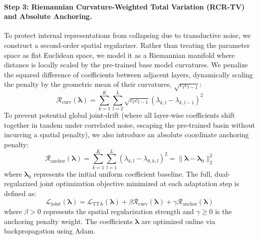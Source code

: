 \paragraph{Step 3: Riemannian Curvature-Weighted Total Variation (RCR-TV) and Absolute Anchoring.}
To protect internal representations from collapsing due to transductive noise, we construct a second-order spatial regularizer. Rather than treating the parameter space as flat Euclidean space, we model it as a Riemannian manifold where distance is locally scaled by the pre-trained base model curvatures. We penalize the squared difference of coefficients between adjacent layers, dynamically scaling the penalty by the geometric mean of their curvatures, $\sqrt{c_l c_{l-1}}$:
\begin{equation}
\label{eq:rcr_tv}
\mathcal{R}_{\text{curv}}(\boldsymbol{\lambda}) = \sum_{k=1}^K \sum_{l=2}^{L} \sqrt{c_l c_{l-1}} (\lambda_{k, l} - \lambda_{k, l-1})^2
\end{equation}
To prevent potential global joint-drift (where all layer-wise coefficients shift together in tandem under correlated noise, escaping the pre-trained basin without incurring a spatial penalty), we also introduce an absolute coordinate anchoring penalty:
\begin{equation}
\label{eq:anchor_penalty}
\mathcal{R}_{\text{anchor}}(\boldsymbol{\lambda}) = \sum_{k=1}^K \sum_{l=1}^L (\lambda_{k, l} - \lambda_{0, k, l})^2 = \|\boldsymbol{\lambda} - \boldsymbol{\lambda}_0\|_2^2
\end{equation}
where $\boldsymbol{\lambda}_0$ represents the initial uniform coefficient baseline. The full, dual-regularized joint optimization objective minimized at each adaptation step is defined as:
\begin{equation}
\label{eq:joint_loss}
\mathcal{L}_{\text{joint}}(\boldsymbol{\lambda}) = \mathcal{L}_{\text{TTA}}(\boldsymbol{\lambda}) + \beta \mathcal{R}_{\text{curv}}(\boldsymbol{\lambda}) + \gamma \mathcal{R}_{\text{anchor}}(\boldsymbol{\lambda})
\end{equation}
where $\beta > 0$ represents the spatial regularization strength and $\gamma \ge 0$ is the anchoring penalty weight. The coefficients $\boldsymbol{\lambda}$ are optimized online via backpropagation using Adam.

